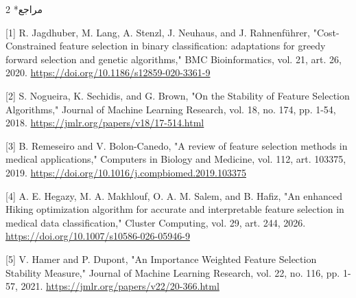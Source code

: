 \documentclass[10pt,a4paper]{article}
\makeatletter
\renewcommand{\section}{\@startsection{section}{1}{0pt}{5pt}{2pt}{\normalfont\normalsize\bfseries}}
\newcommand{\sect}[1]{\section*{#1}}
\makeatother
\begin{document}
\begin{multicols}{2}
\sect{مراجع}
\begin{minipage}{\linewidth}{\fontsize{7}{8.2}\selectfont \begin{latin}[1] R. Jagdhuber, M. Lang, A. Stenzl, J. Neuhaus, and J. Rahnenführer, "Cost-Constrained feature selection in binary classification: adaptations for greedy forward selection and genetic algorithms," BMC Bioinformatics, vol. 21, art. 26, 2020. \url{https://doi.org/10.1186/s12859-020-3361-9}\end{latin}\par}\end{minipage}\par
\begin{minipage}{\linewidth}{\fontsize{7}{8.2}\selectfont \begin{latin}[2] S. Nogueira, K. Sechidis, and G. Brown, "On the Stability of Feature Selection Algorithms," Journal of Machine Learning Research, vol. 18, no. 174, pp. 1-54, 2018. \url{https://jmlr.org/papers/v18/17-514.html}\end{latin}\par}\end{minipage}\par
\begin{minipage}{\linewidth}{\fontsize{7}{8.2}\selectfont \begin{latin}[3] B. Remeseiro and V. Bolon-Canedo, "A review of feature selection methods in medical applications," Computers in Biology and Medicine, vol. 112, art. 103375, 2019. \url{https://doi.org/10.1016/j.compbiomed.2019.103375}\end{latin}\par}\end{minipage}\par
\begin{minipage}{\linewidth}{\fontsize{7}{8.2}\selectfont \begin{latin}[4] A. E. Hegazy, M. A. Makhlouf, O. A. M. Salem, and B. Hafiz, "An enhanced Hiking optimization algorithm for accurate and interpretable feature selection in medical data classification," Cluster Computing, vol. 29, art. 244, 2026. \url{https://doi.org/10.1007/s10586-026-05946-9}\end{latin}\par}\end{minipage}\par
\begin{minipage}{\linewidth}{\fontsize{7}{8.2}\selectfont \begin{latin}[5] V. Hamer and P. Dupont, "An Importance Weighted Feature Selection Stability Measure," Journal of Machine Learning Research, vol. 22, no. 116, pp. 1-57, 2021. \url{https://jmlr.org/papers/v22/20-366.html}\end{latin}\par}\end{minipage}\par

\end{multicols}
\end{document}
